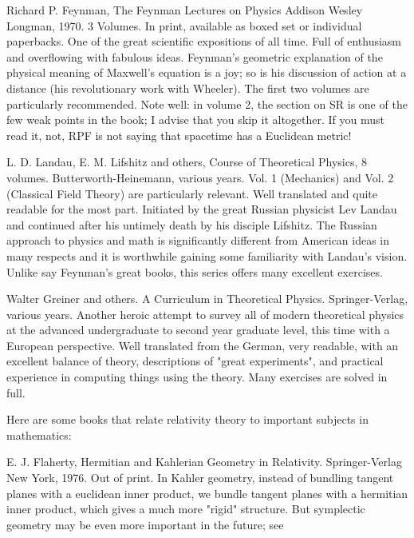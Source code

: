 \documentclass[10pt,a4paper]{book}
\theoremstyle{definition}
\begin{document}
Richard P. Feynman,
The Feynman Lectures on Physics
Addison Wesley Longman, 1970.  3 Volumes.
In print, available as boxed set or individual paperbacks.
One of the great scientific expositions of all time.  Full of enthusiasm and overflowing with fabulous ideas.  Feynman's geometric explanation of the physical meaning of Maxwell's equation is a joy; so is his discussion of action at a distance (his revolutionary work with Wheeler).  The first two volumes are particularly recommended.  Note well: in volume 2, the section on SR is one of the few weak points in the book; I advise that you skip it altogether.  If you must read it, not, RPF is not saying that spacetime has a Euclidean metric!

L. D. Landau, E. M. Lifshitz and others,
Course of Theoretical Physics, 8 volumes.
Butterworth-Heinemann, various years.
Vol. 1 (Mechanics) and Vol. 2 (Classical Field Theory) are particularly relevant.  Well translated and quite readable for the most part.  Initiated by the great Russian physicist Lev Landau and continued after his untimely death by his disciple Lifshitz.  The Russian approach to physics and math is significantly different from American ideas in many respects and it is worthwhile gaining some familiarity with Landau's vision.  Unlike say Feynman's great books, this series offers many excellent exercises.

Walter Greiner and others.
A Curriculum in Theoretical Physics.
Springer-Verlag, various years.
Another heroic attempt to survey all of modern theoretical physics at the advanced undergraduate to second year graduate level, this time with a European perspective.  Well translated from the German, very readable, with an excellent balance of theory, descriptions of "great experiments", and practical experience in computing things using the theory.  Many exercises are solved in full.

Here are some books that relate relativity theory to important subjects in mathematics:

E. J. Flaherty,
Hermitian and Kahlerian Geometry in Relativity.
Springer-Verlag New York, 1976.
Out of print.
In Kahler geometry, instead of bundling tangent planes with a euclidean inner product, we bundle tangent planes with a hermitian inner product, which gives a much more "rigid" structure.  But symplectic geometry may be even more important in the future; see
\end{document}
